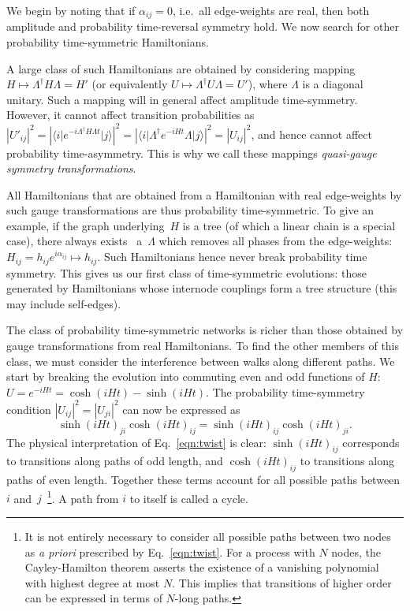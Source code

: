 \documentclass[aps,prx,10pt,
               superscriptaddress,
               twocolumn,
               longbibliography,
showpacs]{revtex4-1}
\theoremstyle{plain}
\theoremstyle{definition}
\newcommand{\bra}[1]{\mbox{$\langle #1|$}}
\newcommand{\ket}[1]{\ensuremath{|#1\rangle}}
\begin{document}
We begin by noting that if $\alpha_{ij} = 0$, i.e.\ all edge-weights are real, then both amplitude and probability time-reversal symmetry hold. We now search for other probability time-symmetric Hamiltonians.

A large class of such Hamiltonians are obtained by considering mapping
$H \mapsto \Lambda^{\dagger} H \Lambda = H'$ (or equivalently
$U \mapsto \Lambda^{\dagger} U \Lambda = U'$), where $\Lambda$ is a diagonal unitary.
Such a mapping will in general affect amplitude time-symmetry. However, it cannot affect transition
probabilities as
$|U'_{ij}|^2 = |\bra{i} e^{-i\Lambda^\dagger H\Lambda t} \ket{j}|^2 =
|\bra{i}\Lambda^\dagger e^{-iH t} \Lambda\ket{j}|^2
= |U_{ij}|^2$,
and hence cannot affect probability time-asymmetry. This is why we
call these mappings {\it quasi-gauge symmetry transformations}.

All Hamiltonians that are obtained from a Hamiltonian with real
edge-weights by such gauge transformations are thus probability
time-symmetric.
To give an example, if the graph underlying~$H$ is a tree (of which a linear chain is a special case), there always
exists~\cite{Z13} a~$\Lambda$ which
removes all phases from the edge-weights:
$H_{ij} = h_{ij} e^{i \alpha_{ij}} \mapsto h_{ij}$.
Such Hamiltonians hence never break probability time symmetry. This gives us our first class of time-symmetric evolutions:
those generated by Hamiltonians whose internode couplings
form a tree structure (this may include self-edges). 

The class of probability time-symmetric networks is richer than those obtained
by gauge transformations from real Hamiltonians.
To find the other members of this class, we must consider the interference
between walks along different paths. We start by breaking the evolution into
commuting even and odd functions of $H$:
$U = e^{-iHt } = \cosh(iHt) -\sinh(iHt)$.
The probability time-symmetry condition
$|U_{ij}|^2 = |U_{ji}|^2$ can now be expressed as
\begin{equation}\label{eqn:twist}
\sinh(iHt)_{ji}\cosh(iHt)_{ij} = \sinh(iHt)_{ij}\cosh(iHt)_{ji}.
\end{equation}
The physical interpretation of Eq.~\eqref{eqn:twist} is clear: 
$\sinh(iHt)_{ij}$ corresponds to transitions along paths of odd length,
and $\cosh(iHt)_{ij}$ to transitions along paths of even length.
Together these terms account for all possible paths between $i$
and~$j$~\footnote{It is not entirely necessary to consider all possible
paths between two nodes as {\em a priori} prescribed by Eq.~\eqref{eqn:twist}.
For a process with $N$ nodes, the Cayley-Hamilton theorem asserts the existence
of a vanishing polynomial with highest degree at most $N$. This implies that
transitions of higher order can be expressed in terms of $N$-long
paths.}. A path from $i$ to itself is called a cycle.
\end{document}
